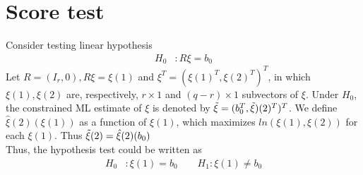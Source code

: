 \section{Score test}
Consider testing linear hypothesis
\begin{align*}
    H_0 &: R \xi = b_0
\end{align*}
Let $R=(I_r, 0), R \xi = \xi{(1)}$ and $\xi^T = (\xi{(1)}^T, \xi(2)^T)^T$, in which $\xi(1), \xi(2)$ are, respectively, $r \times 1$ and $(q-r) \times 1$ subvectors of $\xi$. Under $H_0$, the constrained ML estimate of $\xi$ is denoted by $\Tilde{\xi} = (b_0^T, \Tilde{\xi})(2)^T)^T$. We define $\hat{\xi}(2)(\xi(1))$ as a function of $\xi(1)$, which maximizes $ln(\xi(1), \xi(2))$ for each $\xi(1)$. Thus $\Tilde{\xi}(2) = \hat{\xi}(2)(b_0)$\\
Thus, the hypothesis test could be written as
\begin{align*}
    H_0 &: \xi(1) = b_0 \qquad  H_1 : \xi(1) \neq b_0
\end{align*}
